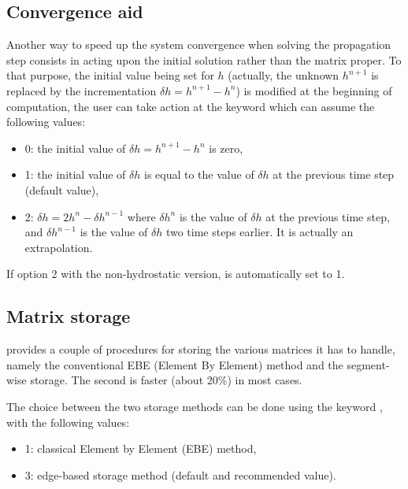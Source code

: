 \subsection{Convergence aid}

Another way to speed up the system convergence when solving the propagation
step consists in acting upon the initial solution rather than the matrix
proper. To that purpose, the initial value being set for $h$ (actually,
the unknown $h^{n+1}$ is replaced by the incrementation $\delta h=h^{n+1} -h^{n}$)
is modified at the beginning of computation, the user can take action at the
keyword  which can assume the following values:

\begin{itemize}
\item 0: the initial value of $\delta h=h^{n+1} -h^{n} $ is zero,

\item 1: the initial value of $\delta h$ is equal to the value of $\delta h$
at the previous time step (default value),

\item 2: $\delta h=2h^{n} -\delta h^{n-1} $ where $\delta h^{n} $ is the value
of $\delta h$ at the previous time step, and $\delta h^{n-1} $ is the value of
$\delta h$ two time steps earlier. It is actually an extrapolation.
\end{itemize}

If option 2 with the non-hydrostatic version, 
is automatically set to 1.

\subsection{Matrix storage}

 provides a couple of procedures for storing the various matrices it
has to handle, namely the conventional EBE (Element By Element) method and the
segment-wise storage.
The second is faster (about 20\%) in most cases.

The choice between the two storage methods can be done using the keyword
, with the following values:

\begin{itemize}
\item 1: classical Element by Element (EBE) method,

\item 3: edge-based storage method (default and recommended value).
\end{itemize}

